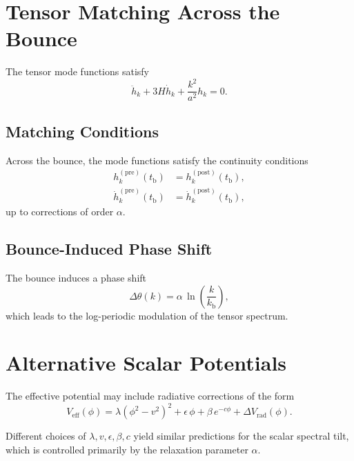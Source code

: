 \documentclass[11pt,a4paper]{article}
\begin{document}
\section{Tensor Matching Across the Bounce}
\label{app:tensor}

The tensor mode functions satisfy
\begin{equation}
\ddot{h}_{k}
    + 3H\dot{h}_{k}
    + \frac{k^{2}}{a^{2}} h_{k}
    = 0.
\end{equation}

\subsection{Matching Conditions}

Across the bounce, the mode functions satisfy the continuity conditions
\begin{align}
h_{k}^{\mathrm{(pre)}}(t_{\mathrm{b}})
    &= h_{k}^{\mathrm{(post)}}(t_{\mathrm{b}}), \\
\dot{h}_{k}^{\mathrm{(pre)}}(t_{\mathrm{b}})
    &= \dot{h}_{k}^{\mathrm{(post)}}(t_{\mathrm{b}}),
\end{align}
up to corrections of order \(\alpha\).

\subsection{Bounce-Induced Phase Shift}

The bounce induces a phase shift
\begin{equation}
\Delta\theta(k)
    = \alpha\,\ln\!\left(\frac{k}{k_{\mathrm{b}}}\right),
\end{equation}
which leads to the log-periodic modulation of the tensor spectrum.

\section{Alternative Scalar Potentials}
\label{app:potentials}

The effective potential may include radiative corrections of the form
\begin{equation}
V_{\mathrm{eff}}(\phi)
    = \lambda(\phi^{2} - v^{2})^{2}
      + \epsilon\,\phi
      + \beta\,e^{-c\phi}
      + \Delta V_{\mathrm{rad}}(\phi).
\end{equation}

Different choices of \(\lambda, v, \epsilon, \beta, c\) yield similar predictions
for the scalar spectral tilt, which is controlled primarily by the relaxation
parameter \(\alpha\).
\end{document}
